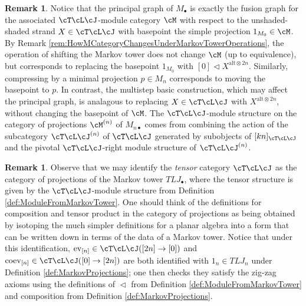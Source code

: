 \documentclass[11pt]{article}
\theoremstyle{plain}
\theoremstyle{definition}
\newtheorem{rem}[thm]{Remark}
\DeclareMathOperator{\coev}{coev}
\DeclareMathOperator{\End}{End}
\DeclareMathOperator{\ev}{ev}
\DeclareMathOperator{\Obj}{Obj}
\newcommand{\TLJ}{\cT\cL\cJ}
\begin{document}
\begin{rem}
 Notice that the principal graph of $M_\bullet$ is exactly the fusion graph for the associated $\cT\cL\cJ$-module category $\cM$ with respect to the unshaded-shaded strand $X\in \cT\cL\cJ$ with basepoint the simple projection $1_{M_0}\in \cM$. By Remark \ref{rem:HowMCategoryChangesUnderMarkovTowerOperations}, the operation of shifting the Markov tower does not change $\cM$ (up to equivalence), but corresponds to replacing the basepoint $1_{M_0}$ with $[0]\vartriangleleft X^{\text{alt}\otimes 2n}$. 
 Similarly, compressing by a minimal projection $p\in M_n$ corresponds to moving the basepoint to $p$.
 In contrast, the multistep basic construction, which may affect the principal graph, is analagous to replacing $X\in\TLJ$ with $X^{\text{alt}\otimes 2n}$, without changing the basepoint of $\cM$. The $\TLJ$-module structure on the category of projections $\cM^{(n)}$ of $M_{n\bullet}$ comes from combining the action of the subcategory $\TLJ^{(n)}$ of $\TLJ$ generated by subobjects of $[kn]_{\TLJ}$ %
 and the pivotal $\TLJ$-right module structure of $\TLJ^{(n)}$.
\end{rem}

\begin{rem}
 \label{rem:TLAsCatOfProjections}
Observe that we may identify the \emph{tensor} category $\TLJ$ as the category of projections of the Markov tower ${TLJ}_\bullet$, where the tensor structure is given by the $\TLJ$-module structure from Definition \ref{def:ModuleFromMarkovTower}. 
 One should think of the definitions for composition and tensor product in the category of projections as being obtained by isotoping the much simpler definitions for a planar algebra into a form that can be written down in terms of the data of a Markov tower. 
 Notice that under this identification, $\ev_{[n]}\in\cT\cL\cJ([2n]\to[0])$ and $\coev_{[n]}\in\cT\cL\cJ([0]\to[2n])$ are both identified with $1_n\in TLJ_n$ under Definition \ref{def:MarkovProjections}; one then checks they satisfy the zig-zag axioms using the definitions of $\vartriangleleft$ from Definition \ref{def:ModuleFromMarkovTower} and composition from Definition \ref{def:MarkovProjections}.
\end{rem}
\end{document}
